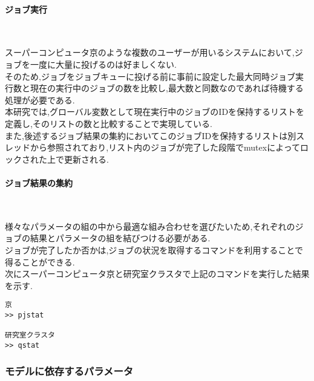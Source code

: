 \paragraph{ジョブ実行}~\\
{\footnotesize

}
スーパーコンピュータ京のような複数のユーザーが用いるシステムにおいて,ジョブを一度に大量に投げるのは好ましくない.\\
そのため,ジョブをジョブキューに投げる前に事前に設定した最大同時ジョブ実行数と現在の実行中のジョブの数を比較し,最大数と同数なのであれば待機する処理が必要である.\\
本研究では,グローバル変数として現在実行中のジョブのIDを保持するリストを定義し,そのリストの数と比較することで実現している.\\
また,後述するジョブ結果の集約においてこのジョブIDを保持するリストは別スレッドから参照されており,リスト内のジョブが完了した段階でmutexによってロックされた上で更新される.\\
\paragraph{ジョブ結果の集約}~\\
{\footnotesize

}
様々なパラメータの組の中から最適な組み合わせを選びたいため,それぞれのジョブの結果とパラメータの組を結びつける必要がある.\\
ジョブが完了したか否かは,ジョブの状況を取得するコマンドを利用することで得ることができる.\\
次にスーパーコンピュータ京と研究室クラスタで上記のコマンドを実行した結果を示す.\\
{\footnotesize
\begin{lstlisting}[numbers=none]
京
>> pjstat

研究室クラスタ
>> qstat
\end{lstlisting}
}
\subsubsection{モデルに依存するパラメータ}

